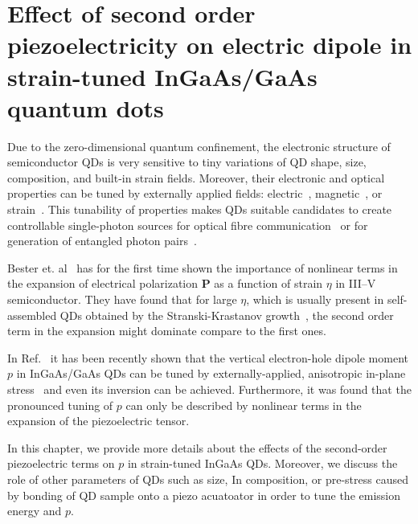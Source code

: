 
\chapter{Effect of second order piezoelectricity on electric dipole in strain-tuned InGaAs/GaAs quantum dots}\label{chap:2order_piezo}

Due to the zero-dimensional quantum confinement, the electronic structure of semiconductor QDs is very sensitive to tiny variations of QD shape, size, composition, and built-in strain fields.
%
%
Moreover, their electronic and optical properties can be tuned by externally applied fields: electric~\cite{Gerardot_2007, Vogel_2007}, magnetic~\cite{Stevenson_2006}, or strain~\citep{kleDresden}. This tunability of properties makes QDs suitable candidates to create controllable single-photon sources for optical fibre communication~\cite{Huffaker1998} or for generation of entangled photon pairs~\cite{Trotta:16}.

Bester et. al~\citep{Bester:06, Bester:06_2} has for the first time shown the importance of nonlinear terms in the expansion of electrical polarization $\mathbf{P}$ as a function of strain $\eta$ in III--V semiconductor. They have found that for large $\eta$, which is usually present in self-assembled QDs obtained by the Stranski-Krastanov growth~\cite{Grundmann}, the second order term in the expansion might dominate compare to the first ones.

In Ref.~\cite{Aberl:17} it has been recently shown that the vertical electron-hole dipole moment $p$ in InGaAs/GaAs QDs can be tuned by externally-applied, anisotropic in-plane stress~\cite{Trotta:12,Trotta:13} and even its inversion can be achieved. Furthermore, it was found that the pronounced tuning of $p$ can only be described by nonlinear terms in the expansion of the piezoelectric tensor. 

In this chapter, we provide more details about the effects of the second-order piezoelectric terms on $p$ in strain-tuned InGaAs QDs. Moreover, we discuss the role of other parameters of QDs such as size, In composition, or pre-stress caused by bonding of QD sample onto a piezo acuatoator in order to tune the emission energy and $p$. 

